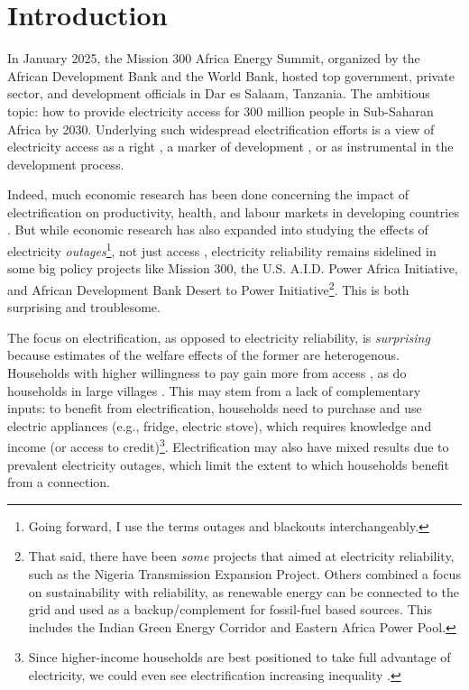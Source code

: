 \documentclass[12pt]{article}
\begin{document}
\section{Introduction}
In January 2025, the Mission 300 Africa Energy Summit, organized by the African Development Bank and the World Bank, hosted top government, private sector, and development officials in Dar es Salaam, Tanzania. The ambitious topic: how to provide electricity access for 300 million people in Sub-Saharan Africa by 2030. Underlying such widespread electrification efforts is a view of electricity access as a right \cite{burgess2020a}, a marker of development \cite{dinkelman2011a}, or as instrumental in the development process.
\par
Indeed, much economic research has been done concerning the impact of electrification on productivity, health, and labour markets in developing countries \cite{burlig2024a} \cite{dasso2015a} \cite{dinkelman2011a} \cite{fried2020a} \cite{grogan2013a} \cite{lee2020a} \cite{lipscomb2013a} \cite{nano2022a} \cite{salmon2016a}. But while economic research has also expanded into studying the effects of electricity \textit{outages}\footnote{Going forward, I use the terms outages and blackouts interchangeably.}, not just access \cite{alam2013a} \cite{allcott2016a} \cite{andersen2013a} \cite{chakravorty2014a} \cite{cole2018a} \cite{dzansi2018a} \cite{hardy2019a} \cite{mensah2024a}, electricity reliability remains sidelined in some big policy projects like Mission 300, the U.S. A.I.D. Power Africa Initiative, and African Development Bank Desert to Power Initiative\footnote{That said, there have been \textit{some} projects that aimed at electricity reliability, such as the Nigeria Transmission Expansion Project. Others combined a focus on sustainability with reliability, as renewable energy can be connected to the grid and used as a backup/complement for fossil-fuel based sources. This includes the Indian Green Energy Corridor and Eastern Africa Power Pool.}. This is both surprising and troublesome. 
\par
The focus on electrification, as opposed to electricity reliability, is \textit{surprising} because estimates of the welfare effects of the former are heterogenous. Households with higher willingness to pay gain more from access \cite{lee2020a}, as do households in large villages \cite{burlig2024a}. This may stem from a lack of complementary inputs: to benefit from electrification, households need to purchase and use electric appliances (e.g., fridge, electric stove), which requires knowledge and income (or access to credit)\footnote{Since higher-income households are best positioned to take full advantage of electricity, we could even see electrification increasing inequality \cite{lee2020a}.}. Electrification may also have mixed results due to prevalent electricity outages, which limit the extent to which households benefit from a connection.
\end{document}

